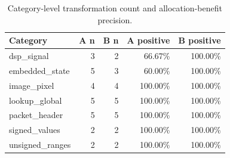 \begin{table}[t]
\centering
\caption{Category-level transformation count and allocation-benefit precision.}
\label{tab:ab-categories}
\scriptsize
\begin{tabular}{@{}lrrrr@{}}
\toprule
Category & A n & B n & A positive & B positive \\
\midrule
dsp\_signal & 3 & 2 & 66.67\% & 100.00\% \\
embedded\_state & 5 & 3 & 60.00\% & 100.00\% \\
image\_pixel & 4 & 4 & 100.00\% & 100.00\% \\
lookup\_global & 5 & 5 & 100.00\% & 100.00\% \\
packet\_header & 5 & 5 & 100.00\% & 100.00\% \\
signed\_values & 2 & 2 & 100.00\% & 100.00\% \\
unsigned\_ranges & 2 & 2 & 100.00\% & 100.00\% \\
\bottomrule
\end{tabular}
\end{table}
